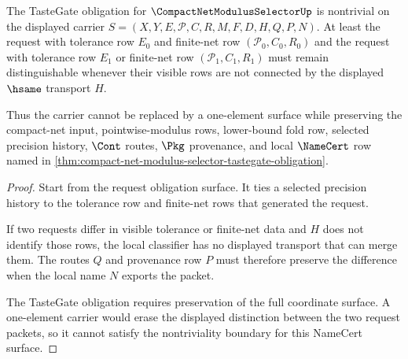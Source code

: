 \begin{theorem}
\label{thm:compact-net-modulus-selector-tastegate-nontriviality-boundary}
The TasteGate obligation for $\CompactNetModulusSelectorUp$ is nontrivial on the displayed carrier $S=(X,Y,E,\mathcal{P},C,R,M,F,D,H,Q,P,N)$. At least the request with tolerance row $E_0$ and finite-net row $(\mathcal{P}_0,C_0,R_0)$ and the request with tolerance row $E_1$ or finite-net row $(\mathcal{P}_1,C_1,R_1)$ must remain distinguishable whenever their visible rows are not connected by the displayed $\hsame$ transport $H$.

Thus the carrier cannot be replaced by a one-element surface while preserving the compact-net input, pointwise-modulus rows, lower-bound fold row, selected precision history, $\Cont$ routes, $\Pkg$ provenance, and local $\NameCert$ row named in \autoref{thm:compact-net-modulus-selector-tastegate-obligation}.
\end{theorem}
\begin{proof}
Start from the request obligation surface. It ties a selected precision history to the tolerance row and finite-net rows that generated the request.

If two requests differ in visible tolerance or finite-net data and $H$ does not identify those rows, the local classifier has no displayed transport that can merge them. The routes $Q$ and provenance row $P$ must therefore preserve the difference when the local name $N$ exports the packet.

The TasteGate obligation requires preservation of the full coordinate surface. A one-element carrier would erase the displayed distinction between the two request packets, so it cannot satisfy the nontriviality boundary for this NameCert surface.
\end{proof}

